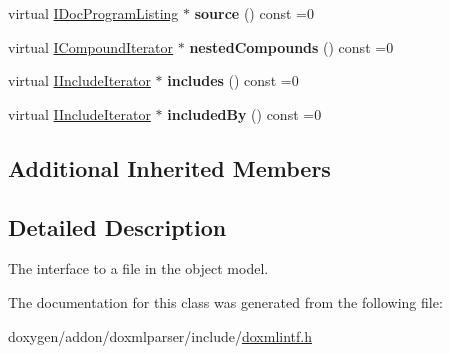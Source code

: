 \begin{DoxyCompactItemize}
virtual \mbox{\hyperlink{class_i_doc_program_listing}{I\+Doc\+Program\+Listing}} $\ast$ {\bfseries source} () const =0
\item 
\mbox{\label{class_i_file_aa163ae8b90e271b05f0e86258e19b8fc}} 
virtual \mbox{\hyperlink{class_i_compound_iterator}{I\+Compound\+Iterator}} $\ast$ {\bfseries nested\+Compounds} () const =0
\item 
\mbox{\label{class_i_file_a142adec80ea4898ab11d4426852f9d03}} 
virtual \mbox{\hyperlink{class_i_include_iterator}{I\+Include\+Iterator}} $\ast$ {\bfseries includes} () const =0
\item 
\mbox{\label{class_i_file_ab6da8519b4cbbc887ab61599f8f27659}} 
virtual \mbox{\hyperlink{class_i_include_iterator}{I\+Include\+Iterator}} $\ast$ {\bfseries included\+By} () const =0
\end{DoxyCompactItemize}
\subsection*{Additional Inherited Members}


\subsection{Detailed Description}
The interface to a file in the object model. 

The documentation for this class was generated from the following file\+:\begin{DoxyCompactItemize}
\item 
doxygen/addon/doxmlparser/include/\mbox{\hyperlink{include_2doxmlintf_8h}{doxmlintf.\+h}}\end{DoxyCompactItemize}
